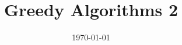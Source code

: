 \documentclass{beamer}
\title[Algorithms 2]{Greedy Algorithms 2} %
\institute[BYU] %
{
Brigham Young University \\ %
\medskip
}
\date{\today} %
\begin{document}
\begin{frame}
\titlepage %
\end{frame}






\end{document}
